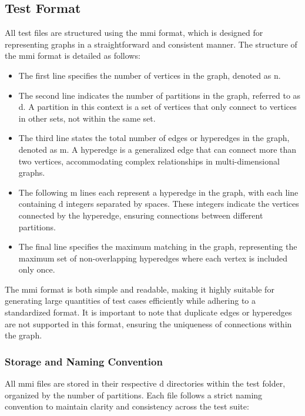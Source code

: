 \subsection{Test Format}
All test files are structured using the mmi format, which is designed for representing graphs in a straightforward and consistent manner. The structure of the mmi format is detailed as follows:

\begin{itemize}
    \item The first line specifies the number of vertices in the graph, denoted as n.
    \item The second line indicates the number of partitions in the graph, referred to as d. A partition in this context is a set of vertices that only connect to vertices in other sets, not within the same set.
    \item The third line states the total number of edges or hyperedges in the graph, denoted as m. A hyperedge is a generalized edge that can connect more than two vertices, accommodating complex relationships in multi-dimensional graphs.
    \item The following m lines each represent a hyperedge in the graph, with each line containing d integers separated by spaces. These integers indicate the vertices connected by the hyperedge, ensuring connections between different partitions.
    \item The final line specifies the maximum matching in the graph, representing the maximum set of non-overlapping hyperedges where each vertex is included only once.
\end{itemize}

The mmi format is both simple and readable, making it highly suitable for generating large quantities of test cases efficiently while adhering to a standardized format. It is important to note that duplicate edges or hyperedges are not supported in this format, ensuring the uniqueness of connections within the graph.

\subsubsection{Storage and Naming Convention}
All mmi files are stored in their respective d directories within the test folder, organized by the number of partitions. Each file follows a strict naming convention to maintain clarity and consistency across the test suite:

